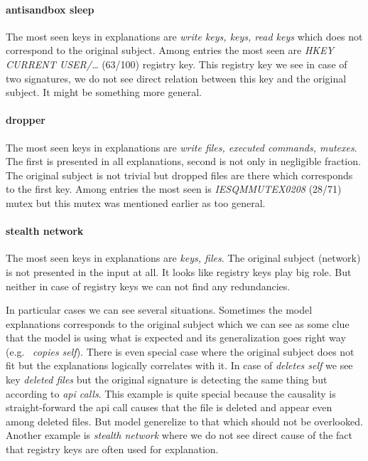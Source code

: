 \paragraph{antisandbox sleep}
The most seen keys in explanations are \emph{write keys, keys, read keys} which does not correspond to the original subject. Among entries the most seen are \emph{HKEY CURRENT USER/\dots} (63/100) registry key. This registry key we see in case of two signatures, we do not see direct relation between this key and the original subject. It might be something more general.

\paragraph{dropper}
The most seen keys in explanations are \emph{write files, executed commands, mutexes}. The first is presented in all explanations, second is not only in negligible fraction. The original subject is not trivial but dropped files are there which corresponds to the first key. Among entries the most seen is \emph{IESQMMUTEX0208} (28/71) mutex but this mutex was mentioned earlier as too general.

\paragraph{stealth network}
The most seen keys in explanations are \emph{keys, files}. The original subject (network) is not presented in the input at all. It looks like registry keys play big role. But neither in case of registry keys we can not find any redundancies.

In particular cases we can see several situations. Sometimes the model explanations corresponds to the original subject which we can see as some clue that the model is using what is expected and its generalization goes right way (e.g. \ \emph{copies self}). There is even special case where the original subject does not fit but the explanations logically correlates with it. In case of \emph{deletes self} we see key \emph{deleted files} but the original signature is detecting the same thing but according to \emph{api calls}. This example is quite special because the causality is straight-forward the api call causes that the file is deleted and appear even among deleted files. But model generelize to that which should not be overlooked. Another example is \emph{stealth network} where we do not see direct cause of the fact that registry keys are often used for explanation.


